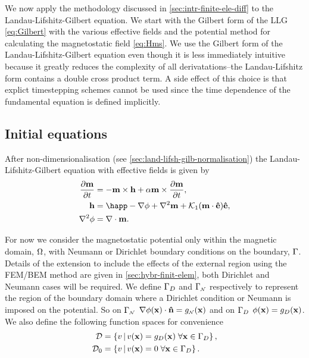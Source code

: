 We now apply the methodology discussed in \cref{sec:intr-finite-ele-diff} to the Landau-Lifshitz-Gilbert equation.
We start with the Gilbert form of the LLG \cref{eq:Gilbert} with the various effective fields and the potential method for calculating the magnetostatic field \cref{eq:Hms}.
We use the Gilbert form of the Landau-Lifshitz-Gilbert equation even though it is less immediately intuitive because it greatly reduces the complexity of all derivatations--the Landau-Lifshitz form contains a double cross product term.
A side effect of this choice is that explict timestepping schemes cannot be used since the time dependence of the fundamental equation is defined implicitly.

\subsection{Initial equations}

After non-dimensionalisation (see \cref{sec:land-lifsh-gilb-normalisation}) the Landau-Lifshitz-Gilbert equation with effective fields is given by
\begin{equation}
  \begin{aligned}
    \dmdt &= - \mv \times \hv + \alpha \mv \times \dmdt, \\
    \hv &= \happ - \nabla \phim + \lap \mv + \kone (\mv \cdot \ev) \ev, \\
    \lap \phim &= \div \mv.
    \label{eqn:ndllg-starting}
  \end{aligned}
\end{equation}

For now we consider the magnetostatic potential only within the magnetic domain, $\Omega$, with Neumann or Dirichlet boundary conditions on the boundary, ${\Gamma}$. 
Details of the extension to include the effects of the external region using the FEM/BEM method are given in \cref{sec:hybr-finit-elem}, both Dirichlet and Neumann cases will be required.
We define ${\Gamma}_D$ and ${\Gamma}_{\scriptscriptstyle{\mathcal{N}}}$ respectively to represent the region of the boundary domain where a Dirichlet condition or Neumann is imposed on the potential.
So on ${\Gamma}_{\scriptscriptstyle{\mathcal{N}}}$ $\nabla \phi(\mathbf{x}) \cdot \mathbf{\hat{n}} = g_{\scriptscriptstyle{\mathcal{N}}}(\mathbf{x})$ and on ${\Gamma}_D$ $\phi(\mathbf{x}) = g_D(\mathbf{x})$.
We also define the following function spaces for convenience
\begin{equation}
\begin{aligned}
  \label{eq:037}
  \mathcal{D} & = \left\{ { v \,|\, v(\mathbf{x}) = g_D(\mathbf{x}) \; \forall \mathbf{x} \in {\Gamma}_D } \right\}, \\
  \mathcal{D}_0 &= \left\{ { v \,|\, v(\mathbf{x}) = 0 \; \forall \mathbf{x} \in {\Gamma}_D } \right\}.
\end{aligned}
\end{equation}

